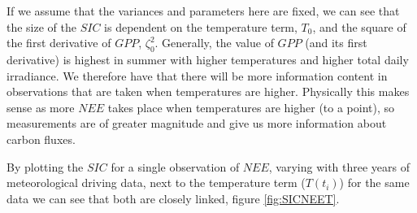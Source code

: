 \documentclass[11pt]{article}
\begin{document}
If we assume that the variances and parameters here are fixed, we can see that the size of the $SIC$ is dependent on the temperature term, $T_0$, and the square of the first derivative of $GPP$, $\zeta_0^{2}$. Generally, the value of $GPP$ (and its first derivative) is highest in summer with higher temperatures and higher total daily irradiance. We therefore have that there will be more information content in observations that are taken when temperatures are higher. Physically this makes sense as more $NEE$ takes place when temperatures are higher (to a point), so measurements are of greater magnitude and give us more information about carbon fluxes. 

By plotting the $SIC$ for a single observation of $NEE$, varying with three years of meteorological driving data, next to the temperature term ($T(t_i)$) for the same data we can see that both are closely linked, figure \ref{fig:SICNEET}.
\end{document}
